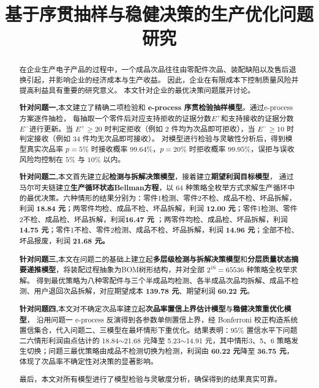 \documentclass[withoutpreface,bwprint]{cumcmthesis}
\title{基于序贯抽样与稳健决策的生产优化问题研究}  %
\numberwithin{equation}{section}
\begin{document}
	
\maketitle
\begin{abstract}

在企业生产电子产品的过程中，一个成品次品往往由零配件次品、装配缺陷以及售后退换引起，并影响企业的经济成本与生产收益。
因此，企业在有限成本下控制质量风险并提高利益具有重要的研究意义。
本文针对企业的最优决策问题展开讨论。

\textbf{针对问题一,}本文建立了精确二项检验和\textbf{ e-process 序贯检验抽样模型}。通过e-process 方案逐件抽检，
每抽取一个零件后对应支持拒收的证据分数$E^+$和支持接收的证据分数$E^-$进行更新。当 $E^+\geq 20$ 时判定拒收（例如 $2$ 件均为次品即可拒收），当 $E^-\geq 10$ 时判定接收（例如 $34$ 件均无次品即可接收）。
对模型进行检验与灵敏性分析后，得到模型真实次品率 $p=5\%$ 时接收概率 $99.64\%$，$p=20\%$ 时拒收概率 $99.95\%$，误拒与误收风险均控制在 $5\%$ 与 $10\%$ 以内。


\textbf{针对问题二,}本文首先建立起\textbf{检测与拆解决策模型}，接着建立\textbf{期望利润目标模型}，
通过马尔可夫链建立\textbf{生产循环状态Bellman方程}，以 64 种策略全枚举方式求解生产循环中的最优决策。六种情形的结果分别为：零件1检测、零件2不检、成品不检、坏品拆解，利润 \textbf{18.84 元}；两零件均检、成品不检、坏品拆解，利润 \textbf{12.00 元}；零件1检测、零件2不检、成品检、坏品拆解，利润\textbf{16.47 元} ；两零件均检、成品检、坏品拆解，利润 \textbf{14.75 元}；零件1不检、零件2检测、成品不检、坏品拆解，利润 \textbf{14.96 元}；全部不检、坏品报废，利润 \textbf{21.68 元。}


\textbf{针对问题三,}本文在问题二的基础上建立起\textbf{多层级检测与拆解决策模型}和\textbf{分层质量状态摘要递推模型}，将装配过程抽象为BOM树形结构，并对全部 $2^{16}=65536$ 种策略全枚举求解。
得到最优策略为八种零配件与三个半成品均检测、各半成品次品均拆解、成品不检测、用户退回次品拆解，对应期望成本 \textbf{139.78 元}、期望利润 \textbf{60.22 元}。

\textbf{针对问题四,}本文对不确定次品率建立起\textbf{次品率置信上界估计模型}与\textbf{稳健决策重优化模型}，
沿用问题一 e-process 反演得到各参数单侧置信上界，经 Bonferroni 校正构造系统置信集合，代入问题二、三模型在最坏情形下重优化。结果表明：$95\%$ 置信水平下问题二六情形利润由点估计的 18.84$\sim$21.68 元降至 5.23$\sim$14.91 元，其中情形3、5、6 策略发生切换；问题三最优策略由成品不检测切换为检测，利润由 \textbf{60.22 元}降至 \textbf{36.75 元}，体现了次品率不确定性对决策的显著影响。

最后，本文对所有模型进行了模型检验与灵敏度分析，确保得到的结果真实可靠。


  \vfill
{}

\end{abstract}
\end{document}

